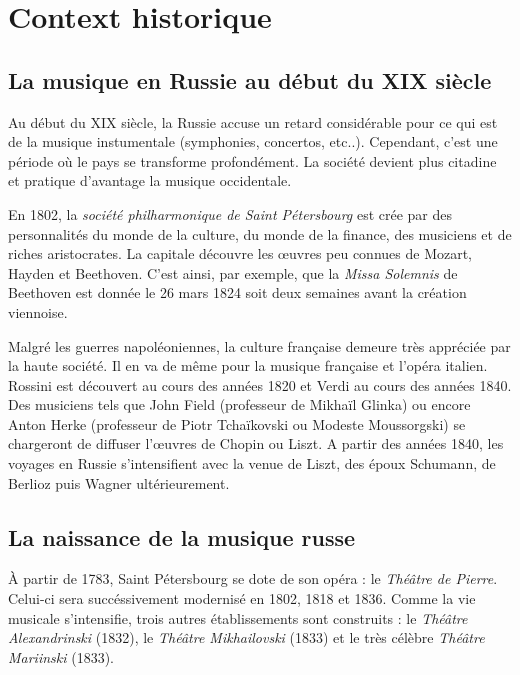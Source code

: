 
\chapter{Context historique}

\section{La musique en Russie au début du XIX\ieme{} siècle}

Au début du XIX\ieme{} siècle, la Russie accuse un retard considérable pour ce qui est de la musique instumentale (symphonies, concertos, etc..). Cependant, c'est une période où le pays se transforme profondément. La société devient plus citadine et pratique d'avantage la musique occidentale.

En 1802, la \emph{société philharmonique de Saint Pétersbourg} est crée par des personnalités du monde de la culture, du monde de la finance, des musiciens et de riches aristocrates. La capitale découvre les œuvres peu connues de Mozart, Hayden et Beethoven. C'est ainsi, par exemple, que la \emph{Missa Solemnis} de Beethoven est donnée le 26 mars 1824 soit deux semaines avant la création viennoise.

Malgré les guerres napoléoniennes, la culture française demeure très appréciée par la haute société. Il en va de même pour la musique française et l'opéra italien. Rossini est découvert au cours des années 1820 et Verdi au cours des années 1840. Des musiciens tels que John Field (professeur de Mikhaïl Glinka) ou encore Anton Herke (professeur de Piotr Tchaïkovski ou Modeste Moussorgski) se chargeront de diffuser l'œuvres de Chopin ou Liszt. A partir des années 1840, les voyages en Russie s'intensifient avec la venue de Liszt, des époux Schumann, de Berlioz puis Wagner ultérieurement.

\section{La naissance de la musique russe}

À partir de 1783, Saint Pétersbourg se dote de son opéra : le \emph{Théâtre de Pierre}. Celui-ci sera succéssivement modernisé en 1802, 1818 et 1836. Comme la vie musicale s'intensifie, trois autres établissements sont construits : le \emph{Théâtre Alexandrinski} (1832), le \emph{Théâtre Mikhailovski} (1833) et le très célèbre \emph{Théâtre Mariinski} (1833).

